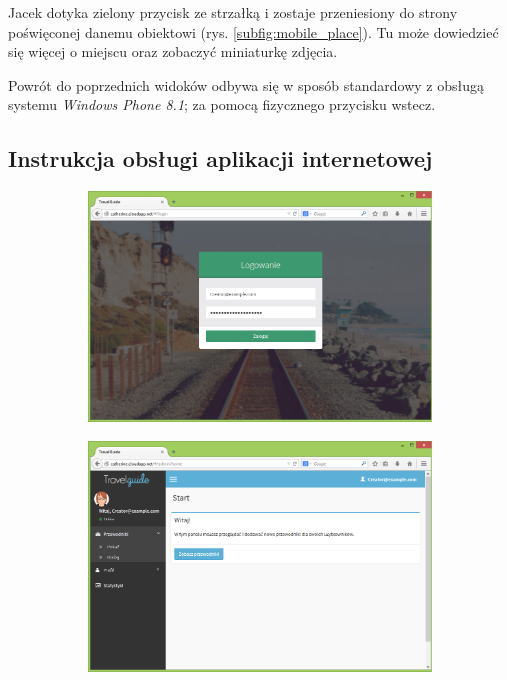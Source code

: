 \documentclass{book}
\begin{document}
		Jacek dotyka zielony przycisk ze strzałką i zostaje przeniesiony do strony poświęconej danemu obiektowi (rys. \ref{subfig:mobile_place}). Tu może dowiedzieć się więcej o miejscu oraz zobaczyć miniaturkę zdjęcia.
		
		Powrót do poprzednich widoków odbywa się w sposób standardowy z obsługą systemu \emph{Windows Phone 8.1}; za pomocą fizycznego przycisku wstecz. 		 

		\subsection{Instrukcja obsługi aplikacji internetowej}
		
		\begin{figure}[H]
			
			\begin{subfigure}{1\textwidth}
				\includegraphics[width=\textwidth]{screenshots/web/1logowanie.png}					
				\caption{\label{subfig:web_login}}
			\end{subfigure}
			\hfill
			\begin{subfigure}{1\textwidth}
				\includegraphics[width=\textwidth]{screenshots/web/2powitanie.png}					
				\caption{\label{subfig:web_welcome}}	
			\end{subfigure}
			
		\end{figure}
\end{document}
